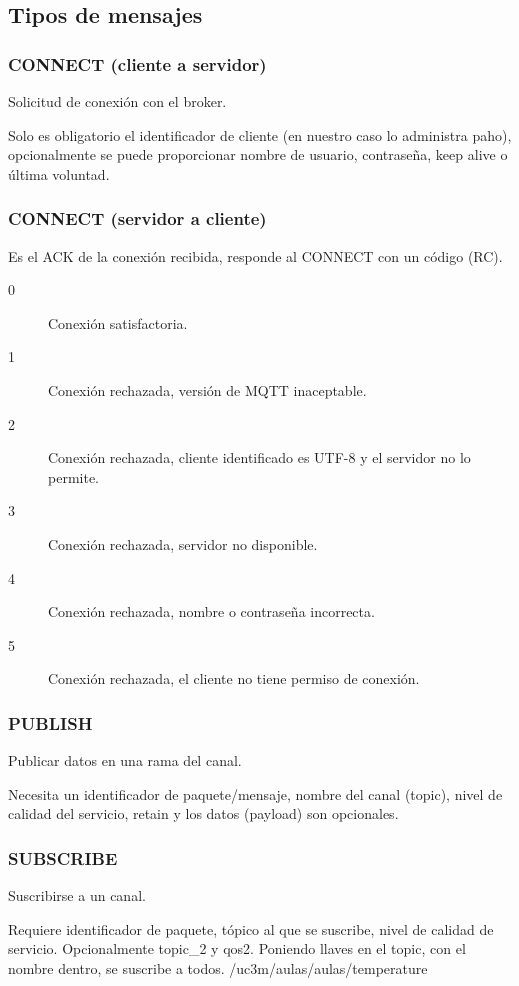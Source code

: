 \documentclass[12pt, twoside, openright]{report} %
\begin{document}
\subsection{Tipos de mensajes}
\subsubsection{CONNECT (cliente a servidor)}
Solicitud de conexión con el broker.

Solo es obligatorio el identificador de cliente (en nuestro caso lo administra paho), opcionalmente se puede proporcionar nombre de usuario, contraseña, keep alive o última voluntad.

\subsubsection{CONNECT (servidor a cliente)}
Es el ACK de la conexión recibida, responde al CONNECT con un código (RC).
\begin{description}
	\item[0] Conexión satisfactoria.
	\item[1] Conexión rechazada, versión de MQTT inaceptable.
	\item[2] Conexión rechazada, cliente identificado es UTF-8 y el servidor no lo permite.
	\item[3] Conexión rechazada, servidor no disponible.
	\item[4] Conexión rechazada, nombre o contraseña incorrecta.
	\item[5] Conexión rechazada, el cliente no tiene permiso de conexión.
\end{description}

\subsubsection{PUBLISH}
Publicar datos en una rama del canal.

Necesita un identificador de paquete/mensaje, nombre del canal (topic), nivel de calidad del servicio, retain y los datos (payload) son opcionales.

\subsubsection{SUBSCRIBE}
Suscribirse a un canal.

Requiere identificador de paquete, tópico al que se suscribe, nivel de calidad de servicio. Opcionalmente topic\_2 y qos2. Poniendo llaves en el topic, con el nombre dentro, se suscribe a todos. /uc3m/aulas/{aulas}/temperature
\end{document}
